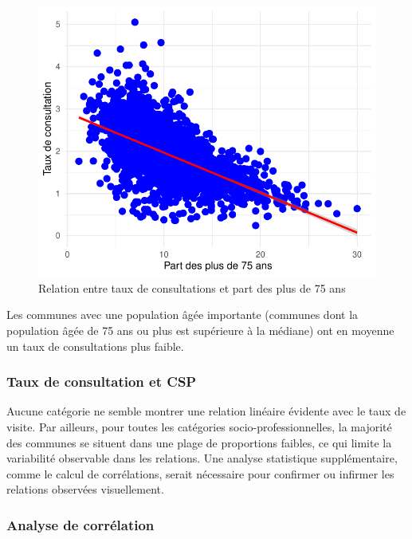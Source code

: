 \documentclass[
]{article}
\begin{document}
\begin{figure}

{\centering \includegraphics{rapport_intermediaire_files/figure-latex/unnamed-chunk-23-1} 

}

\caption{Relation entre taux de consultations et part des plus de 75 ans}\label{fig:unnamed-chunk-23}
\end{figure}

Les communes avec une population âgée importante (communes dont la
population âgée de 75 ans ou plus est supérieure à la médiane) ont en
moyenne un taux de consultations plus faible.

\subsubsection{Taux de consultation et
CSP}\label{taux-de-consultation-et-csp}

Aucune catégorie ne semble montrer une relation linéaire évidente avec
le taux de visite. Par ailleurs, pour toutes les catégories
socio-professionnelles, la majorité des communes se situent dans une
plage de proportions faibles, ce qui limite la variabilité observable
dans les relations. Une analyse statistique supplémentaire, comme le
calcul de corrélations, serait nécessaire pour confirmer ou infirmer les
relations observées visuellement.

\subsubsection{Analyse de corrélation}\label{analyse-de-corruxe9lation}
\end{document}
